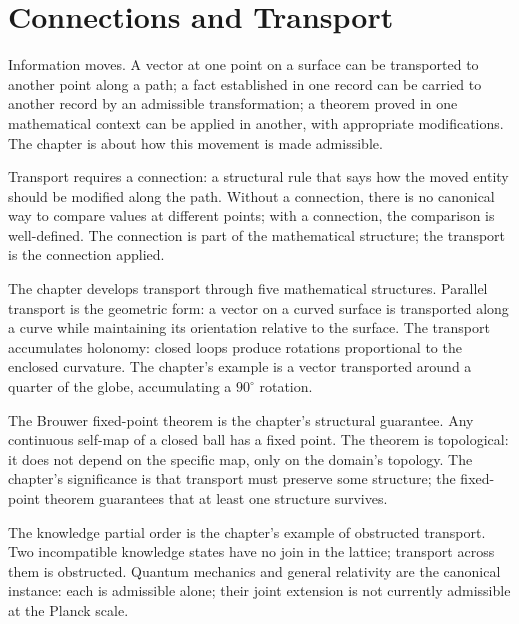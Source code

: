 \chapter{Connections and Transport}
\label{chap:connections-and-transport}


\begin{chapteressay}

Information moves. A vector at one point on a surface can be
transported to another point along a path; a fact established in
one record can be carried to another record by an admissible
transformation; a theorem proved in one mathematical context can
be applied in another, with appropriate modifications. The
chapter is about how this movement is made admissible.

Transport requires a connection: a structural rule that says how the
moved entity should be modified along the path. Without a
connection, there is no canonical way to compare values at
different points; with a connection, the comparison is well-defined.
The connection is part of the mathematical structure; the transport
is the connection applied.

The chapter develops transport through five mathematical structures.
Parallel transport is the geometric form: a vector on a curved
surface is transported along a curve while maintaining its
orientation relative to the surface. The transport accumulates
holonomy: closed loops produce rotations proportional to the
enclosed curvature. The chapter's example is a vector transported
around a quarter of the globe, accumulating a $90^\circ$ rotation.

The Brouwer fixed-point theorem is the chapter's structural
guarantee. Any continuous self-map of a closed ball has a fixed
point. The theorem is topological: it does not depend on the
specific map, only on the domain's topology. The chapter's
significance is that transport must preserve some structure;
the fixed-point theorem guarantees that at least one structure
survives.

The knowledge partial order is the chapter's example of obstructed
transport. Two incompatible knowledge states have no join in the
lattice; transport across them is obstructed. Quantum mechanics
and general relativity are the canonical instance: each is
admissible alone; their joint extension is not currently
admissible at the Planck scale.


\end{chapteressay}
